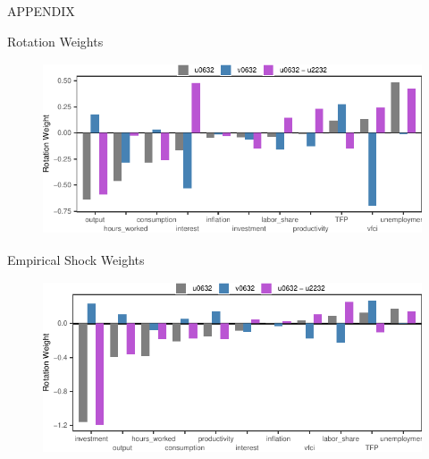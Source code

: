 \begin{frame}
    \frametitle{}
    \centering
    \Huge
    APPENDIX
\end{frame}


\begin{frame}{Rotation Weights }
    
    \vspace{-0.25cm}
    
    \begin{figure}
        \includegraphics[height = 2in]{figs/fig7_weights.pdf}
    \end{figure}

\end{frame}


\begin{frame}{Empirical Shock Weights }
    
    \vspace{-0.25cm}
    
    \begin{figure}
        \includegraphics[height = 2in]{figs/fig11_emp_weights.pdf}
    \end{figure}

\end{frame}




